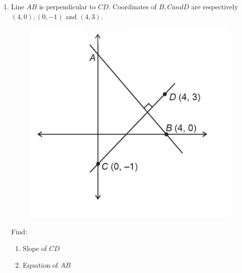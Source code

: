 \begin{enumerate}
	\item Line $AB$ is perpendicular to $CD$. Coordinates of $B, C and D$ are respectively $(4, 0), (0, -1)$ and $(4,3)$.
		\begin{figure}[h]
			\centering
			\includegraphics[width=\columnwidth]{figs/img6.jpg}
			\caption{}
			\label{figure}
		\end{figure}
		Find:
		\begin{enumerate}
			\item Slope of $CD$
			\item Equation of $AB$
		\end{enumerate}
\end{enumerate}
